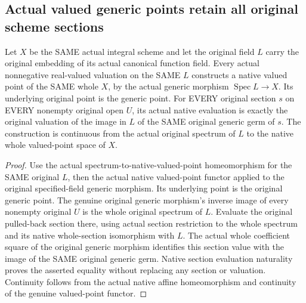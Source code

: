 \subsection{Actual valued generic points retain all original scheme sections}

\begin{lemma}
\label{lem:actual-specified-field-native-valued-generic-point}
\leanok
Let $X$ be the SAME actual integral scheme and let the original field
$L$ carry the original embedding of its actual canonical function field.
Every actual nonnegative real-valued valuation on the SAME $L$ constructs
a native valued point of the SAME whole $X$, by the actual generic
morphism $\operatorname{Spec}L\to X$. Its underlying original point is
the generic point. For EVERY original section $s$ on EVERY nonempty
original open $U$, its actual native evaluation is exactly the original
valuation of the image in $L$ of the SAME original generic germ of $s$.
The construction is continuous from the actual original spectrum of $L$
to the native whole valued-point space of $X$.
\end{lemma}
\begin{proof}
Use the actual spectrum-to-native-valued-point homeomorphism for the
SAME original $L$, then the actual native valued-point functor applied
to the original specified-field generic morphism. Its underlying point
is the original generic point. The genuine original generic morphism's
inverse image of every nonempty original $U$ is the whole original
spectrum of $L$. Evaluate the original pulled-back section there,
using actual section restriction to the whole spectrum and its native
whole-section isomorphism with $L$. The actual whole coefficient square
of the original generic morphism identifies this section value with
the image of the SAME original generic germ. Native section evaluation
naturality proves the asserted equality without replacing any section
or valuation. Continuity follows from the actual native affine
homeomorphism and continuity of the genuine valued-point functor.
\end{proof}
